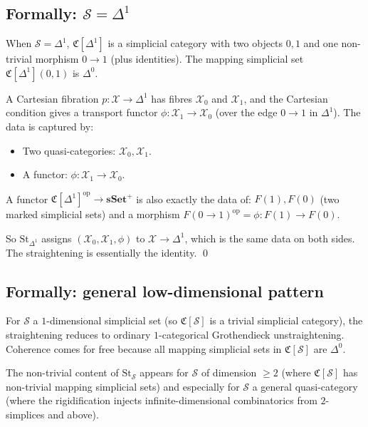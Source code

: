 \subsection{Formally: $\mathcal{S} = \Delta^1$}

\begin{example_thm}
\label{ex:straighten-arrow}
When $\mathcal{S} = \Delta^1$, $\mathfrak{C}[\Delta^1]$ is a simplicial
category with two objects $0, 1$ and one non-trivial morphism $0 \to 1$
(plus identities). The mapping simplicial set $\mathfrak{C}[\Delta^1](0, 1)$
is $\Delta^0$.

A Cartesian fibration $p : \mathcal{X} \to \Delta^1$ has fibres $\mathcal{X}_0$
and $\mathcal{X}_1$, and the Cartesian condition gives a transport functor
$\phi : \mathcal{X}_1 \to \mathcal{X}_0$ (over the edge $0 \to 1$ in
$\Delta^1$). The data is captured by:
\begin{itemize}
  \item Two quasi-categories: $\mathcal{X}_0, \mathcal{X}_1$.
  \item A functor: $\phi : \mathcal{X}_1 \to \mathcal{X}_0$.
\end{itemize}

A functor $\mathfrak{C}[\Delta^1]^{\mathrm{op}} \to \mathbf{sSet}^+$ is
also exactly the data of: $F(1), F(0)$ (two marked simplicial sets) and
a morphism $F(0 \to 1)^{\mathrm{op}} = \phi : F(1) \to F(0)$.

So $\mathrm{St}_{\Delta^1}$ assigns $(\mathcal{X}_0, \mathcal{X}_1, \phi)$
to $\mathcal{X} \to \Delta^1$, which is the same data on both sides. The
straightening is essentially the identity. \qed
\end{example_thm}

\subsection{Formally: general low-dimensional pattern}

\begin{remark}
For $\mathcal{S}$ a $1$-dimensional simplicial set (so $\mathfrak{C}[\mathcal{S}]$
is a trivial simplicial category), the straightening reduces to ordinary
$1$-categorical Grothendieck unstraightening. Coherence comes for free
because all mapping simplicial sets in $\mathfrak{C}[\mathcal{S}]$ are
$\Delta^0$.

The non-trivial content of $\mathrm{St}_\mathcal{S}$ appears for
$\mathcal{S}$ of dimension $\geq 2$ (where $\mathfrak{C}[\mathcal{S}]$ has
non-trivial mapping simplicial sets) and especially for $\mathcal{S}$
a general quasi-category (where the rigidification injects
infinite-dimensional combinatorics from $2$-simplices and above).
\end{remark}


